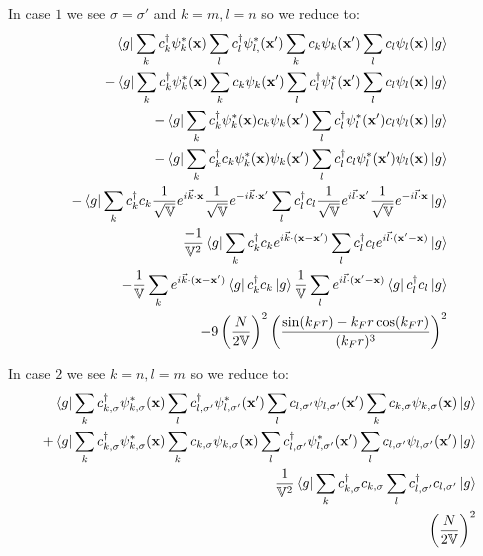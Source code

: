 \documentclass{beamer}
\newcommand{\V}{\mathbb{V}}
\begin{document}
\begin{frame}
In case $1$ we see $\sigma = \sigma'$ and $k=m, l=n$ so we reduce to:
\begin{align*}
\bra{g}\sum_k c_{k}^\dagger \psi_{k}^\ast(\x) \sum_{l} c_{l}^\dagger \psi_{l,}^\ast (\x') \sum_k c_{k} \psi_{k}(\x') \sum_l c_{l} \psi_{l}(\x) \ket{g} \\
-\bra{g}\sum_k c_{k}^\dagger \psi_{k}^\ast(\x)  \sum_k c_{k} \psi_{k}(\x') \sum_{l} c_{l}^\dagger \psi_{l}^\ast (\x') \sum_l c_{l} \psi_{l}(\x) \ket{g} \\
-\bra{g}\sum_k c_{k}^\dagger \psi_{k}^\ast(\x) c_{k} \psi_{k}(\x') \sum_{l} c_{l}^\dagger \psi_{l}^\ast (\x') c_{l} \psi_{l}(\x) \ket{g} \\
-\bra{g}\sum_k c_{k}^\dagger c_{k} \psi_{k}^\ast(\x) \psi_{k}(\x') \sum_{l} c_{l}^\dagger  c_{l}\psi_{l}^\ast (\x') \psi_{l}(\x) \ket{g} \\
-\bra{g}\sum_k c_{k}^\dagger c_{k} \frac{1}{\sqrt{\V}} e^{i\vec{k}\cdot\x} \frac{1}{\sqrt{\V}}e^{-i\vec{k}\cdot\x'} \sum_{l} c_{l}^\dagger  c_{l} \frac{1}{\sqrt{\V}}e^{i\vec{l}\cdot\x'} \frac{1}{\sqrt{\V}}e^{-i\vec{l}\cdot\x}\ket{g} \\
\frac{-1}{\V^2}\bra{g}\sum_k c_{k}^\dagger c_{k} e^{i\vec{k}\cdot(\x-\x')} \sum_{l} c_{l}^\dagger  c_{l} e^{i\vec{l}\cdot(\x'-\x)} \ket{g} \\
-\frac{1}{\V}\sum_k e^{i\vec{k}\cdot(\x-\x')} \bra{g} c_{k}^\dagger c_{k} \ket{g} \frac{1}{\V} \sum_l e^{i\vec{l}\cdot(\x'-\x)} \bra{g} c_{l}^\dagger  c_{l} \ket{g} \\
-9\left(\frac{N}{2\V}\right)^2 \left( \frac{\sin(k_Fr) - k_Fr \cos(k_Fr)}{(k_Fr)^3}\right)^2
\end{align*}

In case $2$ we see $k=n, l=m$ so we reduce to:
\begin{align*}
\bra{g}\sum_k c_{k,\sigma}^\dagger \psi_{k,\sigma}^\ast(\x) \sum_{l} c_{l,\sigma'}^\dagger \psi_{l,\sigma'}^\ast (\x') \sum_l c_{l,\sigma'} \psi_{l,\sigma'}(\x') \sum_k c_{k,\sigma} \psi_{k,\sigma}(\x) \ket{g} \\
+\bra{g}\sum_k c_{k,\sigma}^\dagger \psi_{k,\sigma}^\ast(\x) \sum_k c_{k,\sigma} \psi_{k,\sigma}(\x) \sum_{l} c_{l,\sigma'}^\dagger \psi_{l,\sigma'}^\ast (\x') \sum_l c_{l,\sigma'} \psi_{l,\sigma'}(\x')  \ket{g} \\
\frac{1}{\V^2} \bra{g} \sum_k c_{k,\sigma}^\dagger c_{k,\sigma} \sum_l c_{l,\sigma'}^\dagger c_{l,\sigma'} \ket{g} \\
\left(\frac{N}{2\V}\right)^2
\end{align*}


\end{frame}
\end{document}
